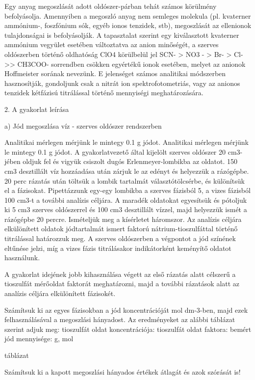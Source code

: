 Egy anyag megoszlását adott oldószer-párban tehát számos körülmény befolyásolja.
Amennyiben a megoszló anyag nem semleges molekula (pl. kvaterner ammónium-, foszfónium sók, egyéb ionos tenzidek, stb), megoszlását az ellenionok tulajdonságai is befolyásolják.
A tapasztalat szerint egy kiválasztott kvaterner ammónium vegyület esetében változtatva az anion minőségét, a szerves oldószerben történő oldhatóság ClO4 körülbelül jel SCN- > NO3 - > Br- > Cl- >> CH3COO- sorrendben csökken egyértékű ionok esetében, melyet az anionok Hoffmeister sorának nevezünk.
E jelenséget számos analitikai módszerben hasznosítják, gondoljunk csak a nitrát ion spektrofotometriás, vagy az anionos tenzidek kétfázisú titrálással történő mennyiségi meghatározására.


2. A gyakorlat leírása


a) Jód megoszlása víz - szerves oldószer rendszerben

Analitikai mérlegen mérjünk le mintegy 0.1 g jódot.
Analitikai mérlegen mérjünk le mintegy 0.1 g jódot. A gyakorlatvezető által kijelölt szerves oldószer 20 cm3-jében oldjuk fel és vigyük csiszolt dugós Erlenmeyer-lombikba az oldatot.
150 cm3 desztillált víz hozzáadása után zárjuk le az edényt és helyezzük a rázógépbe.
20 perc rázatás után töltsük a lombik tartalmát választótölcsérbe, és különítsük el a fázisokat.
Pipettázzunk egy-egy lombikba a szerves fázisból 5, a vizes fázisból 100 cm3-t a további analízis céljára.
A maradék oldatokat egyesítsük és pótoljuk ki 5 cm3 szerves oldószerrel és 100 cm3 desztillált vízzel, majd helyezzük ismét a rázógépbe 20 percre.
Ismételjük meg a kísérletet háromszor.
Az analízis céljára elkülönített oldatok jódtartalmát ismert faktorú nátrium-tioszulfáttal történő titrálással határozzuk meg.
A szerves oldószerben a végpontot a jód színének eltűnése jelzi, míg a vizes fázis titrálásakor indikátorként keményítő oldatot használunk.

A gyakorlat idejének jobb kihasználása végett az első rázatás alatt célszerű a tioszulfát mérőoldat faktorát meghatározni, majd a további rázatások alatt az analízis céljára elkülönített fázisokét.

Számítsuk ki az egyes fázisokban a jód koncentrációját mol dm-3-ben, majd ezek felhasználásával a megoszlási hányadost.
Az eredményeket az alábbi táblázat szerint adjuk meg:
tioszulfát oldat koncentrációja:
tioszulfát oldat faktora:
bemért jód mennyisége: g, mol

táblázat

Számítsuk ki a kapott megoszlási hányados értékek átlagát és azok szórását is!


